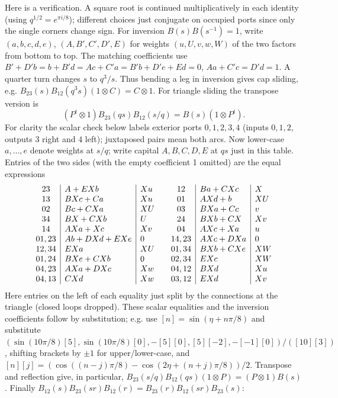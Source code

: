 \documentclass[11pt]{article}
\numberwithin{equation}{section}
\theoremstyle{definition}\newtheorem{definition}[theorem]{Definition}
\theoremstyle{remark}\newtheorem{remark}[theorem]{Remark}
\begin{document}
Here is a verification. A square root is continued multiplicatively in each identity (using \(q^{1/2}=e^{\pi i/8}\)); different choices just conjugate on occupied ports since only the single corners change sign. For inversion \(B(s)B(s^{-1})=1\), write \((a,b,c,d,e)\), \((A,B',C',D',E)\) for weights \((u,U,v,w,W)\) of the two factors from bottom to top. The matching coefficients use
\(B'+D'b=b+B'd=A c+C'a=B'b+D'e+E d=0\), \(A a+C'c=D'd=1\).
A quarter turn changes \(s\) to \(q^3/s\). Thus bending a leg in inversion gives cap sliding, e.g. \(B_{23}(s)B_{12}(q^3s)(1\otimes C)=C\otimes1\).
For triangle sliding the transpose version is
\[
 (P^t\otimes1)B_{23}(qs) B_{12}(s/q)=B(s)(1\otimes P^t).
\]
For clarity the scalar check below labels exterior ports \(0,1,2,3,4\) (inputs \(0,1,2\), outputs \(3\) right and \(4\) left); juxtaposed pairs mean both arcs. Now lower-case \(a,\ldots,e\) denote weights at \(s/q\); write capital \(A,B,C,D,E\) at \(qs\) just in this table. Entries of the two sides (with the empty coefficient 1 omitted) are the equal expressions
\[
\begin{array}{c|l|l@{\qquad}c|l|l}
23&A+EXb&Xu&12&Ba+C Xc&X\\
13&B Xc+C a&Xu&01&A Xd+b&XU\\
02&B c+C Xa&XU&03&B Xa+C c&v\\
34&B X+C Xb&U&24&B Xb+C X&Xv\\
14&A Xa+X c&Xv&04&A Xc+X a&u\\
01,23&A b+D Xd+E Xe&0&14,23&A Xc+D Xa&0\\
12,34&E Xa&XU&01,34&B Xb+C Xe&XW\\
01,24&B Xe+C Xb&0&02,34&E Xc&XW\\
04,23&A Xa+D Xc&Xw&04,12&B Xd&Xu\\
04,13&C Xd&Xw&03,12&E Xd&Xv
\end{array}
\]
Here entries on the left of each equality just split by the connections at the triangle (closed loops dropped). These scalar equalities and the inversion coefficients follow by substitution; e.g. use \([n]=\sin(\eta+n\pi/8)\) and substitute
\((\sin(10\pi/8)[5],\sin(10\pi/8)[0],-[5][0],[5][-2],-[-1][0])/([10][3])\), shifting brackets by \(\pm1\) for upper/lower-case, and \([n][j]=(\cos((n-j)\pi/8)-\cos(2\eta+(n+j)\pi/8))/2\).
Transpose and reflection give, in particular, \(B_{23}(s/q)B_{12}(qs)(1\otimes P)=(P\otimes1)B(s)\). Finally
\(B_{12}(s)B_{23}(sr)B_{12}(r)=B_{23}(r)B_{12}(sr)B_{23}(s)\):
\end{document}
